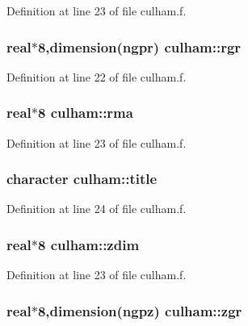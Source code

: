Definition at line 23 of file culham.f.\hypertarget{namespaceculham_2cf8db6042d042662f5152bfd75688e1}{
\subsubsection[rgr]{\setlength{\rightskip}{0pt plus 5cm}real$\ast$8,dimension(ngpr) {\bf culham::rgr}}}
\label{namespaceculham_2cf8db6042d042662f5152bfd75688e1}




Definition at line 22 of file culham.f.\hypertarget{namespaceculham_262f15ecbe6c9fb9d128a5d1e1f7ab8b}{
\subsubsection[rma]{\setlength{\rightskip}{0pt plus 5cm}real$\ast$8 {\bf culham::rma}}}
\label{namespaceculham_262f15ecbe6c9fb9d128a5d1e1f7ab8b}




Definition at line 23 of file culham.f.\hypertarget{namespaceculham_16e7734b25610633d7174a8355319804}{
\subsubsection[title]{\setlength{\rightskip}{0pt plus 5cm}character {\bf culham::title}}}
\label{namespaceculham_16e7734b25610633d7174a8355319804}




Definition at line 24 of file culham.f.\hypertarget{namespaceculham_3a2e93e29b6fdb2c74db87ba4970c103}{
\subsubsection[zdim]{\setlength{\rightskip}{0pt plus 5cm}real$\ast$8 {\bf culham::zdim}}}
\label{namespaceculham_3a2e93e29b6fdb2c74db87ba4970c103}




Definition at line 23 of file culham.f.\hypertarget{namespaceculham_0fe5d01c9279056fcdb29700ac1642fd}{
\subsubsection[zgr]{\setlength{\rightskip}{0pt plus 5cm}real$\ast$8,dimension(ngpz) {\bf culham::zgr}}}
\label{namespaceculham_0fe5d01c9279056fcdb29700ac1642fd}




